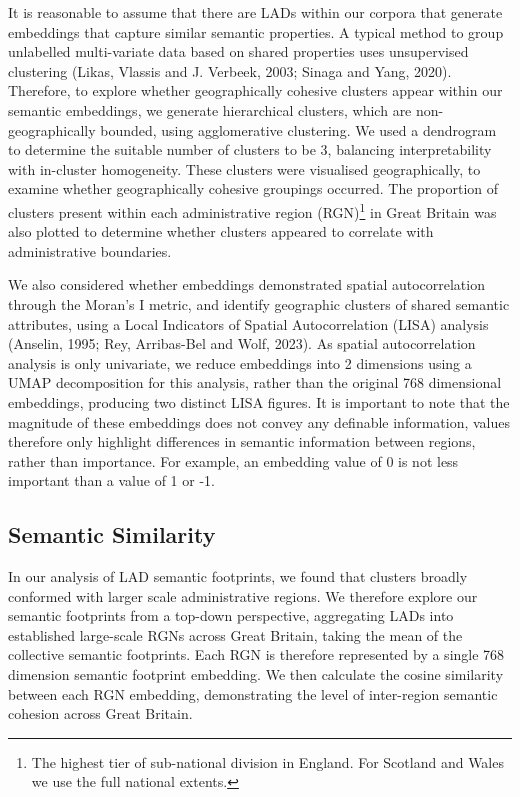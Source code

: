 \documentclass[
  letterpaper,
  11pt,
  english,
  onehalfspacing,
  headsepline]{MastersDoctoralThesis}
\begin{document}
It is reasonable to assume that there are LADs within our corpora that
generate embeddings that capture similar semantic properties. A typical
method to group unlabelled multi-variate data based on shared properties
uses unsupervised clustering (Likas, Vlassis and J. Verbeek, 2003;
Sinaga and Yang, 2020). Therefore, to explore whether geographically
cohesive clusters appear within our semantic embeddings, we generate
hierarchical clusters, which are non-geographically bounded, using
agglomerative clustering. We used a dendrogram to determine the suitable
number of clusters to be 3, balancing interpretability with in-cluster
homogeneity. These clusters were visualised geographically, to examine
whether geographically cohesive groupings occurred. The proportion of
clusters present within each administrative region (RGN)\footnote{The
  highest tier of sub-national division in England. For Scotland and
  Wales we use the full national extents.} in Great Britain was also
plotted to determine whether clusters appeared to correlate with
administrative boundaries.

We also considered whether embeddings demonstrated spatial
autocorrelation through the Moran's I metric, and identify geographic
clusters of shared semantic attributes, using a Local Indicators of
Spatial Autocorrelation (LISA) analysis (Anselin, 1995; Rey, Arribas-Bel
and Wolf, 2023). As spatial autocorrelation analysis is only univariate,
we reduce embeddings into 2 dimensions using a UMAP decomposition for
this analysis, rather than the original 768 dimensional embeddings,
producing two distinct LISA figures. It is important to note that the
magnitude of these embeddings does not convey any definable information,
values therefore only highlight differences in semantic information
between regions, rather than importance. For example, an embedding value
of 0 is not less important than a value of 1 or -1.

\hypertarget{semantic-similarity}{%
\subsection{Semantic Similarity}\label{semantic-similarity}}

In our analysis of LAD semantic footprints, we found that clusters
broadly conformed with larger scale administrative regions. We therefore
explore our semantic footprints from a top-down perspective, aggregating
LADs into established large-scale RGNs across Great Britain, taking the
mean of the collective semantic footprints. Each RGN is therefore
represented by a single 768 dimension semantic footprint embedding. We
then calculate the cosine similarity between each RGN embedding,
demonstrating the level of inter-region semantic cohesion across Great
Britain.
\end{document}
